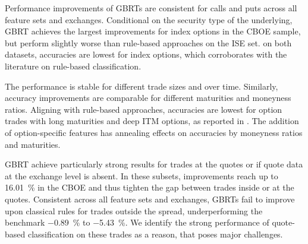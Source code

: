 Performance improvements of \glspl{GBRT} are consistent for calls and puts across all feature sets and exchanges. Conditional on the security type of the underlying, \gls{GBRT} achieves the largest improvements for index options in the \gls{CBOE} sample, but perform slightly worse than rule-based approaches on the \gls{ISE} set. on both datasets, accuracies are lowest for index options, which corroborates with the literature on rule-based classification.

The performance is stable for different trade sizes and over time. Similarly, accuracy improvements are comparable for different maturities and moneyness ratios. Aligning with rule-based approaches, accuracies are lowest for option trades with long maturities and deep \gls{ITM} options, as reported in \textcite[][22]{grauerOptionTradeClassification2022}. The addition of option-specific features has annealing effects on accuracies by moneyness ratios and maturities.

\gls{GBRT} achieve particularly strong results for trades at the quotes or if quote data at the exchange level is absent. In these subsets, improvements reach up to \SI{16.01}{\percent} in the \gls{CBOE} and thus tighten the gap between trades inside or at the quotes. Consistent across all feature sets and exchanges, \glspl{GBRT} fail to improve upon classical rules for trades outside the spread, underperforming the benchmark \SI{-0.89}{\percent} to \SI{-5.43}{\percent}. We identify the strong performance of quote-based classification on these trades as a reason, that poses major challenges.


